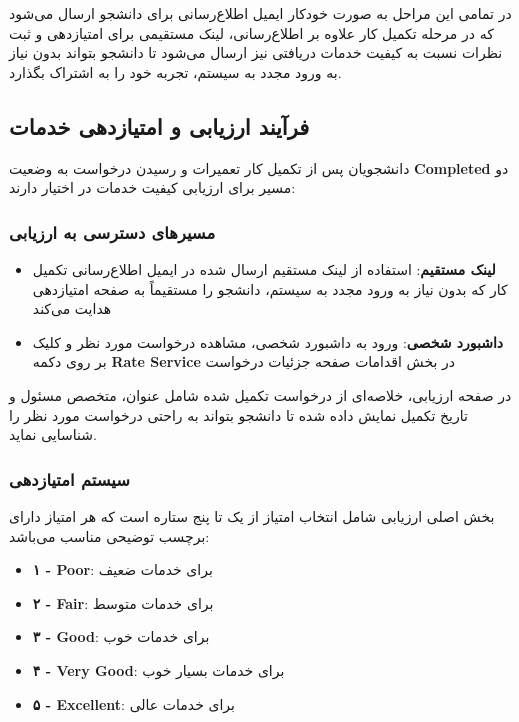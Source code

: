 \documentclass[12pt,a4paper]{report}
\begin{document}
	در تمامی این مراحل به صورت خودکار ایمیل اطلاع‌رسانی برای دانشجو ارسال می‌شود که در مرحله تکمیل کار علاوه بر اطلاع‌رسانی، لینک مستقیمی برای امتیازدهی و ثبت نظرات نسبت به کیفیت خدمات دریافتی نیز ارسال می‌شود تا دانشجو بتواند بدون نیاز به ورود مجدد به سیستم، تجربه خود را به اشتراک بگذارد.
	
	\subsection{فرآیند ارزیابی و امتیازدهی خدمات}
	
	دانشجویان پس از تکمیل کار تعمیرات و رسیدن درخواست به وضعیت \textbf{Completed} دو مسیر برای ارزیابی کیفیت خدمات در اختیار دارند:
	
	\subsubsection*{مسیرهای دسترسی به ارزیابی}
	\begin{itemize}
		\item \textbf{لینک مستقیم}: استفاده از لینک مستقیم ارسال شده در ایمیل اطلاع‌رسانی تکمیل کار که بدون نیاز به ورود مجدد به سیستم، دانشجو را مستقیماً به صفحه امتیازدهی هدایت می‌کند
		\item \textbf{داشبورد شخصی}: ورود به داشبورد شخصی، مشاهده درخواست مورد نظر و کلیک بر روی دکمه \textbf{Rate Service} در بخش اقدامات صفحه جزئیات درخواست
	\end{itemize}
	
	در صفحه ارزیابی، خلاصه‌ای از درخواست تکمیل شده شامل عنوان، متخصص مسئول و تاریخ تکمیل نمایش داده شده تا دانشجو بتواند به راحتی درخواست مورد نظر را شناسایی نماید.
	
	\subsubsection*{سیستم امتیازدهی}
	
	بخش اصلی ارزیابی شامل انتخاب امتیاز از یک تا پنج ستاره است که هر امتیاز دارای برچسب توضیحی مناسب می‌باشد:
	
	\begin{itemize}
		\item \textbf{۱ - Poor}: برای خدمات ضعیف
		\item \textbf{۲ - Fair}: برای خدمات متوسط  
		\item \textbf{۳ - Good}: برای خدمات خوب
		\item \textbf{۴ - Very Good}: برای خدمات بسیار خوب
		\item \textbf{۵ - Excellent}: برای خدمات عالی
	\end{itemize}
	
\end{document}
